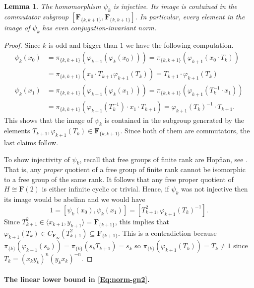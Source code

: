\documentclass[12pt,reqno,a4paper]{article}
\newtheorem{lemma}[theorem]{Lemma}
\theoremstyle{definition}
\theoremstyle{remark}
\numberwithin{equation}{section}
\numberwithin{figure}{section}
\newcommand{\B}[1]{{\mathbf #1}}
\newcommand{\AL}[1]{\textcolor{red}{#1}}
\begin{document}
\begin{lemma}\label{L:psik}
The homomorphism $\psi_k$ is injective.
Its image is contained in the commutator subgroup
$[\B F_{\{k,k+1\}},\B F_{\{k,k+1\}}]$. In particular, every
element in the image of $\psi_k$ has even conjugation-invariant norm.
\end{lemma}
\begin{proof}
Since $k$ is odd and bigger than $1$ we have the following computation.
\begin{align*}
\psi_k(x_0) 
&=\pi_{\{k,k+1\}}(\varphi_{k+1}(\varphi_k(x_0)))
=\pi_{\{k,k+1\}}(\varphi_{k+1}(x_0\cdot T_k))\\
&=\pi_{\{k,k+1\}}(x_0\cdot T_{k+1}\varphi_{k+1}(T_k))
=T_{k+1}\cdot \varphi_{k+1}(T_k)\\
\psi_k(x_1) 
&=\pi_{\{k,k+1\}}(\varphi_{k+1}(\varphi_k(x_1)))
=\pi_{\{k,k+1\}}(\varphi_{k+1}(T_k^{-1}\cdot x_1))\\
&=\pi_{\{k,k+1\}}(\varphi_{k+1}(T_k^{-1})\cdot x_1\cdot T_{k+1})
=\varphi_{k+1}(T_k)^{-1}\cdot T_{k+1}.
\end{align*}
This shows that the image of $\psi_k$ is contained in the subgroup
generated by the elements
$T_{k+1},\varphi_{k+1}(T_k)\in \B F_{\{k,k+1\}}$. 
Since both of them are commutators, the last claims follow.


To show injectivity of $\psi_k$, recall that free groups of finite rank are Hopfian, see \cite[Theorem 2.13]{zbMATH02146477}. %
That is, any {\em proper} quotient of a free group of finite rank cannot be isomorphic to a free group of the same rank.
It follows that any free  proper quotient of $H\cong \B F(2)$ is either infinite cyclic or trivial. 
Hence, if $\psi_k$ was not injective then its image would be
abelian and we would have
$$
1=[\psi_k(x_0),\psi_k(x_1)] = \left[T_{k+1}^2,\varphi_{k+1}(T_k)^{-1}\right].
$$
Since $T_{k+1}^2\in \langle x_{k+1},y_{k+1}\rangle = \B F_{\{k+1\}}$, this implies that $\varphi_{k+1}(T_k) \in C_{\B F_\infty}(T_{k+1}^2) \subseteq \B F_{\{k+1\}}$.
This is a contradiction because $\pi_{\{k\}}(\varphi_{k+1}(s_k))=\pi_{\{k\}}(s_k T_{k+1})=s_k$ so $\pi_{\{k\}}(\varphi_{k+1}(T_k))=T_k \neq 1$ since $T_k=(x_ky_k)^n(y_kx_k)^{-n}$.
\end{proof}


\paragraph{The linear lower bound in \eqref{Eq:norm-gn2}.}
\end{document}
